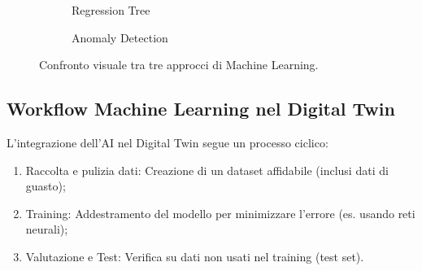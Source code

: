 \begin{figure}[hpb]
\begin{subfigure}[b]{0.32\linewidth}
{}
        \caption{Regression Tree}
        \label{fig:reg_tree}
    \end{subfigure}
    \hfill
    \begin{subfigure}[b]{0.32\linewidth}
        \centering
        \caption{Anomaly Detection}
        \label{fig:anomaly}
    \end{subfigure}

    \caption{Confronto visuale tra tre approcci di Machine Learning.}
    \label{fig:ml_comparison}
\end{figure}
%
\subsection{Workflow Machine Learning nel Digital Twin}
L'integrazione dell'AI nel Digital Twin segue un processo ciclico:
\begin{enumerate}
    \item Raccolta e pulizia dati: Creazione di un dataset affidabile (inclusi dati di guasto);
    \item Training: Addestramento del modello per minimizzare l'errore (es. usando reti neurali);
    \item Valutazione e Test: Verifica su dati non usati nel training (test set).
\end{enumerate}
%
